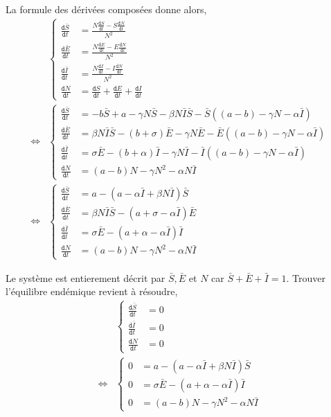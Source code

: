 \documentclass[11pt]{article}
\newcommand{\deriv}{\texttt{d}}
\newcommand{\dt}[1]{\frac{\deriv #1}{\deriv t}}
\newcommand{\ssi}{\Longleftrightarrow}
\begin{document}
La formule des d\'eriv\'ees compos\'ees donne alors,
\begin{align*}
	&\left\{
	\begin{aligned}
		\dt{\bar S} &= \frac{N \dt S - S \dt N}{N^2}\\
		\dt{\bar E} &= \frac{N \dt E - E \dt N}{N^2}\\
		\dt{\bar I} &= \frac{N \dt I - I \dt N}{N^2}\\
		\dt N &= \dt S+ \dt E+ \dt I
	\end{aligned}\right.\\
	\ssi &\left\{
	\begin{aligned}
		\dt{\bar S} &= -b \bar S + a -\gamma N \bar S - \beta N \bar I \bar S - \bar S \left( (a -b)  - \gamma N -\alpha \bar I\right)\\
		\dt{\bar E} &= \beta N \bar I \bar S - (b + \sigma) \bar E -\gamma N \bar E - \bar E \left( (a -b)  - \gamma N -\alpha \bar I\right)\\
		\dt{\bar I} &= \sigma \bar E - (b+ \alpha) \bar I - \gamma N \bar I - \bar I \left( (a -b)  - \gamma N -\alpha \bar I\right)\\
		\dt N &= (a -b) N - \gamma N^2 -\alpha N \bar I
	\end{aligned}\right.\\
	\ssi &\left\{
	\begin{aligned}
		\dt{\bar S} &= a  - \left( a - \alpha \bar I + \beta N \bar I\right) \bar S\\
		\dt{\bar E} &= \beta N \bar I \bar S - (a + \sigma - \alpha \bar I) \bar E \\
		\dt{\bar I} &= \sigma \bar E - (a + \alpha- \alpha \bar I) \bar I\\
		\dt N &= (a -b) N - \gamma N^2 -\alpha N \bar I
	\end{aligned}\right.
\end{align*}

Le syst\`eme est entierement d\'ecrit par $\bar S, \bar E$ et $N$ car $\bar S+\bar E + \bar I = 1$. Trouver l'\'equilibre end\'emique revient \`a r\'esoudre,
\begin{align*}
	&\left\{
	\begin{aligned}
		\dt{\bar S} &= 0\\
		\dt{\bar I} &= 0\\
		\dt N &= 0
	\end{aligned}\right.\\
	\ssi &\left\{
	\begin{aligned}
		0 &= a  - \left( a - \alpha \bar I + \beta N \bar I\right) \bar S\\
		0 &= \sigma \bar E - (a + \alpha- \alpha \bar I) \bar I\\
		0 &= (a -b) N - \gamma N^2 -\alpha N \bar I
	\end{aligned}\right.
\end{align*}
\end{document}
